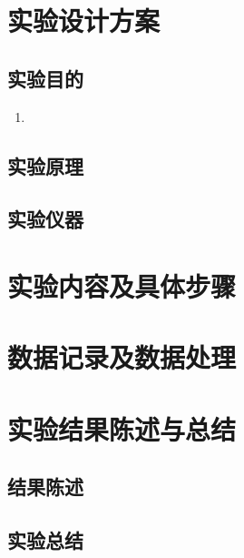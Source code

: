 \documentclass[a4paper]{../phyreport}
\begin{document}
\phyExpCover


\section{实验设计方案}  

\subsection{实验目的}
\begin{enumerate}
  \item 
\end{enumerate}

\subsection{实验原理}

\subsection{实验仪器}

\longLine
\section{实验内容及具体步骤}

\longLine
\section{数据记录及数据处理}

\longLine
\section{实验结果陈述与总结}

\subsection{结果陈述}

\subsection{实验总结}

\endBox
\end{document}
